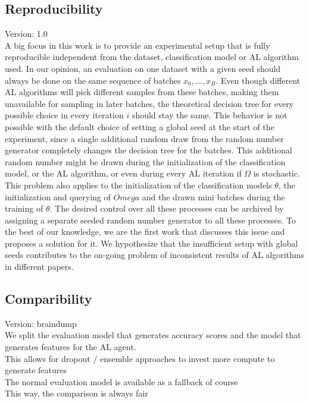 \documentclass[]{article}
\begin{document}
\subsection{Reproducibility}\label{sec:reproducibility}
{\color{red} Version: 1.0}\\
A big focus in this work is to provide an experimental setup that is fully reproducible independent from the dataset, classification model or AL algorithm used.
In our opinion, an evaluation on one dataset with a given seed should always be done on the same sequence of batches $x_0, \ldots, x_B$.
Even though different AL algorithms will pick different samples from these batches, making them unavailable for sampling in later batches, the theoretical decision tree for every possible choice in every iteration $i$ should stay the same.
This behavior is not possible with the default choice of setting a global seed at the start of the experiment, since a single additional random draw from the random number generator completely changes the decision tree for the batches.
This additional random number might be drawn during the initialization of the classification model, or the AL algorithm, or even during every AL iteration if $\Omega$ is stochastic.
This problem also applies to the initialization of the classification models $\theta$, the initialization and querying of $Omega$ and the drawn mini batches during the training of $\theta$.
The desired control over all these processes can be archived by assigning a separate seeded random number generator to all these processes.
To the best of our knowledge, we are the first work that discusses this issue and proposes a solution for it.
We hypothesize that the insufficient setup with global seeds contributes to the on-going problem of inconsistent results of AL algorithms in different papers.

\subsection{Comparibility}\label{sec:comparibility}
{\color{red} Version: braindump}\\
We split the evaluation model that generates accuracy scores and the model that generates features for the AL agent. \\
This allows for dropout / ensemble approaches to invest more compute to generate features \\
The normal evaluation model is available as a fallback of course \\
This way, the comparison is always fair
\end{document}
